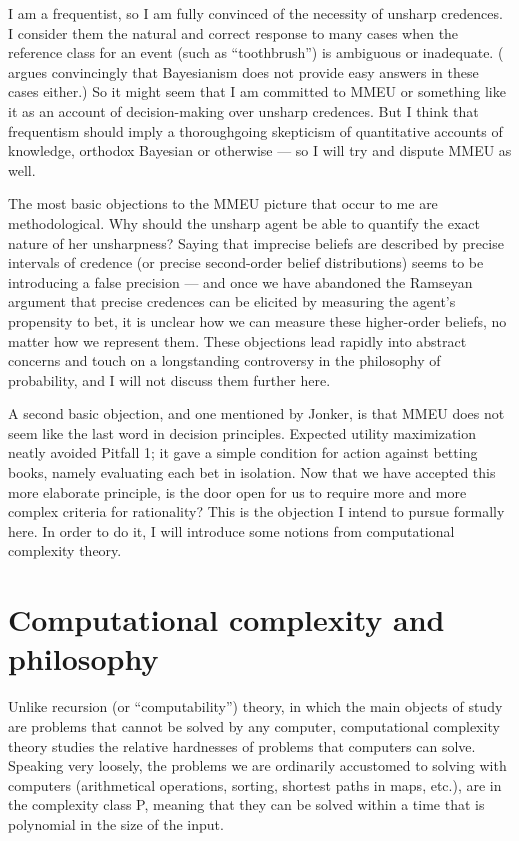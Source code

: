\documentclass[letterpaper,12pt]{article}
\begin{document}
I am a frequentist, so I am fully convinced of the necessity of unsharp credences. I consider them the natural and correct response to many cases when the reference class for an event (such as ``toothbrush'') is ambiguous or inadequate. (\cite{DBLP:journals/synthese/Hajek07} argues convincingly that Bayesianism does not provide easy answers in these cases either.) So it might seem that I am committed to MMEU or something like it as an account of decision-making over unsharp credences. But I think that frequentism should imply a thoroughgoing skepticism of quantitative accounts of knowledge, orthodox Bayesian or otherwise --- so I will try and dispute MMEU as well.

The most basic objections to the MMEU picture that occur to me are methodological. Why should the unsharp agent be able to quantify the exact nature of her unsharpness? Saying that imprecise beliefs are described by precise intervals of credence (or precise second-order belief distributions) seems to be introducing a false precision --- and once we have abandoned the Ramseyan argument that precise credences can be elicited by measuring the agent's propensity to bet, it is unclear how we can measure these higher-order beliefs, no matter how we represent them. These objections lead rapidly into abstract concerns and touch on a longstanding controversy in the philosophy of probability, and I will not discuss them further here.

A second basic objection, and one mentioned by Jonker, is that MMEU does not seem like the last word in decision principles. Expected utility maximization neatly avoided Pitfall 1; it gave a simple condition for action against betting books, namely evaluating each bet in isolation. Now that we have accepted this more elaborate principle, is the door open for us to require more and more complex criteria for rationality? This is the objection I intend to pursue formally here. In order to do it, I will introduce some notions from computational complexity theory.

\section{Computational complexity and philosophy}
Unlike recursion (or ``computability'') theory, in which the main objects of study are problems that cannot be solved by any computer, computational complexity theory studies the relative hardnesses of problems that computers can solve. Speaking very loosely, the problems we are ordinarily accustomed to solving with computers (arithmetical operations, sorting, shortest paths in maps, etc.), are in the complexity class P, meaning that they can be solved within a time that is polynomial in the size of the input.
\end{document}
